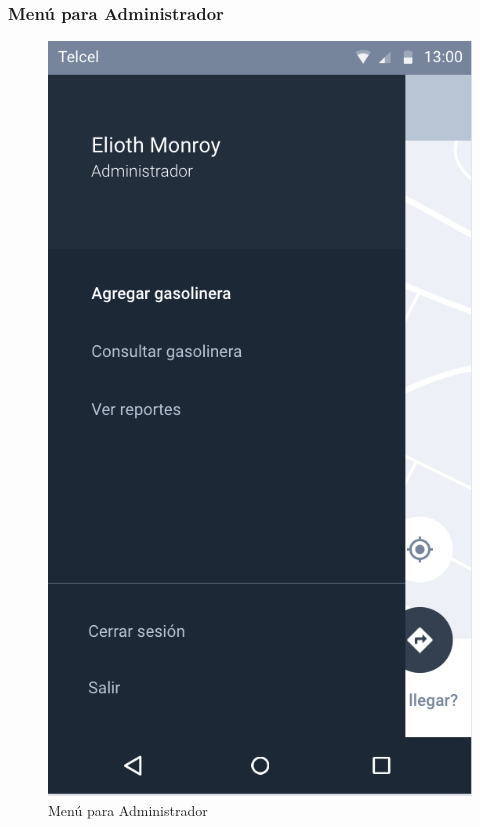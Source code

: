 \subsubsection{Menú para Administrador}\label{Menu-Administrador}
\begin{figure}[H]
	\centering
	\includegraphics[scale=.55]{Capitulo4/software/submodulos/images/menu-admi}
	\caption{Menú para Administrador}
	\label{fig:menu-admi}
\end{figure}